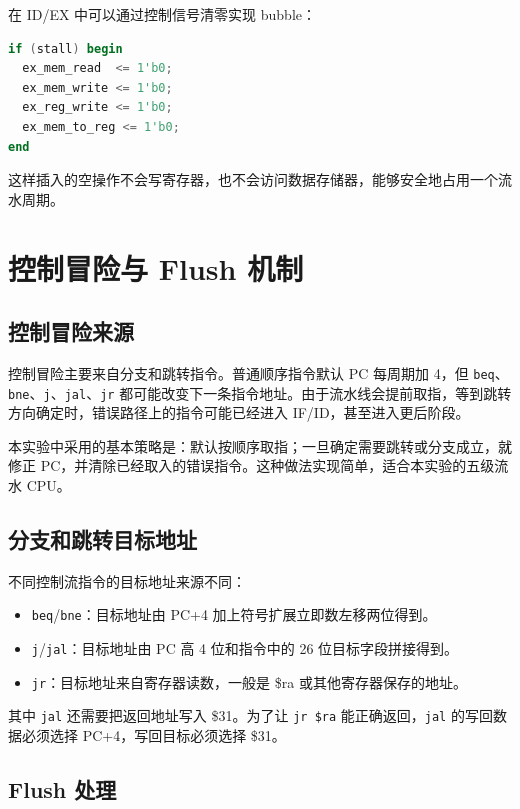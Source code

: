 \documentclass[UTF8,zihao=-4]{ctexart}
\begin{document}
在 ID/EX 中可以通过控制信号清零实现 bubble：

\begin{lstlisting}[language=Verilog]
if (stall) begin
  ex_mem_read  <= 1'b0;
  ex_mem_write <= 1'b0;
  ex_reg_write <= 1'b0;
  ex_mem_to_reg <= 1'b0;
end
\end{lstlisting}

这样插入的空操作不会写寄存器，也不会访问数据存储器，能够安全地占用一个流水周期。

\section{控制冒险与 Flush 机制}

\subsection{控制冒险来源}

控制冒险主要来自分支和跳转指令。普通顺序指令默认 PC 每周期加 4，但 \texttt{beq}、\texttt{bne}、\texttt{j}、\texttt{jal}、\texttt{jr} 都可能改变下一条指令地址。由于流水线会提前取指，等到跳转方向确定时，错误路径上的指令可能已经进入 IF/ID，甚至进入更后阶段。

本实验中采用的基本策略是：默认按顺序取指；一旦确定需要跳转或分支成立，就修正 PC，并清除已经取入的错误指令。这种做法实现简单，适合本实验的五级流水 CPU。

\subsection{分支和跳转目标地址}

不同控制流指令的目标地址来源不同：

\begin{itemize}
  \item \texttt{beq}/\texttt{bne}：目标地址由 PC+4 加上符号扩展立即数左移两位得到。
  \item \texttt{j}/\texttt{jal}：目标地址由 PC 高 4 位和指令中的 26 位目标字段拼接得到。
  \item \texttt{jr}：目标地址来自寄存器读数，一般是 \$ra 或其他寄存器保存的地址。
\end{itemize}

其中 \texttt{jal} 还需要把返回地址写入 \$31。为了让 \texttt{jr \$ra} 能正确返回，\texttt{jal} 的写回数据必须选择 PC+4，写回目标必须选择 \$31。

\subsection{Flush 处理}
\end{document}
